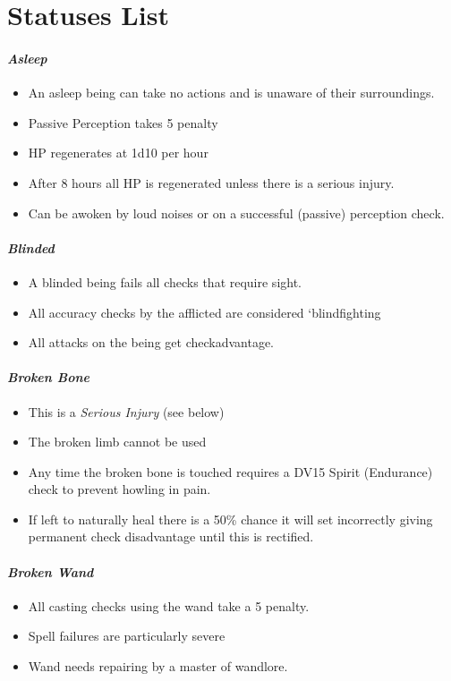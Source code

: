 
\newcommand\status[2]
{
\subsubsection{\it #1}

#2

}

\chapter{Statuses List}\label{S:StatusList}

\status{Asleep}{\begin{itemize} \renewcommand\labelitemi{\minus{}}\item An asleep being can take no actions\comma{} and is unaware of their surroundings.\item Passive Perception takes \minus{}5 penalty\item HP regenerates at 1d10 per hour\item After 8 hours all HP is regenerated\comma{} unless there is a serious injury.\item Can be awoken by loud noises\comma{} or on a successful (passive) perception check.\end{itemize}}

\status{Blinded}{\begin{itemize} \renewcommand\labelitemi{\minus{}}\item A blinded being fails all checks that require sight.\item All accuracy checks by the afflicted are considered `blindfighting\apos{}\item All attacks on the being get check\minus{}advantage.\end{itemize}}

\status{Broken Bone}{\begin{itemize} \renewcommand\labelitemi{\minus{}}\item This is a {\it Serious Injury} (see below)\item The broken limb cannot be used\item Any time the broken bone is touched\comma{} requires a DV15 Spirit (Endurance) check to prevent howling in pain.\item If left to naturally heal\comma{} there is a 50\% chance it will set incorrectly\comma{} giving permanent check disadvantage until this is rectified.\end{itemize}}

\status{Broken Wand}{\begin{itemize} \renewcommand\labelitemi{\minus{}}\item All casting checks using the wand take a \minus{}5 penalty.\item Spell failures are particularly severe\item Wand needs repairing by a master of wandlore.\end{itemize}}

